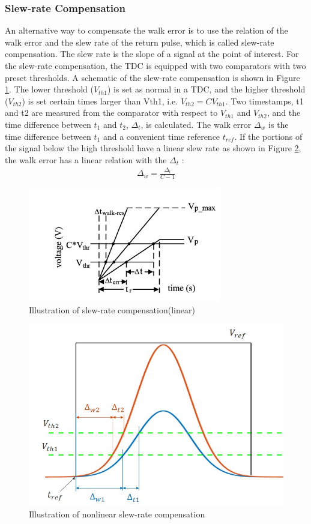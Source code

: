 \subsubsection{Slew-rate Compensation}
An alternative way to compensate the walk error is to use the relation of the walk error and the slew rate of the return pulse, which is called slew-rate compensation. The slew rate is the slope of a signal at the point of interest. For the slew-rate compensation, the TDC is equipped with two comparators with two preset thresholds. A schematic of the slew-rate compensation is shown in Figure \ref{fig:TDC_slewrateLinear}. The lower threshold ($V_{th1}$) is set as normal in a TDC, and the higher threshold ($V_{th2}$) is set certain times larger than Vth1, i.e. $V_{th2} = CV_{th1}$. Two timestamps, t1 and t2 are measured from the comparator with respect to $V_{th1}$ and $V_{th2}$, and the time difference between $t_1$ and $t_2$, $\Delta_t$, is calculated. The walk error $\Delta_w$ is the time difference between $t_1$ and a convenient time reference $t_{ref}$. If the portions of the signal below the high threshold have a linear slew rate as shown in Figure \ref{fig:TDC_slewrate}, the walk error has a linear relation with the $\Delta_t$ \citep{nissinen2009integrated}:
\begin{align}
    \Delta_w=\frac{\Delta_t}{C-1}
\end{align}
\begin{figure}[t!p]
\centering
\includegraphics[width=.8\textwidth]{figures/chapter3_TDC/slew-rate.jpg}
\caption{Illustration of slew-rate compensation(linear)}
\label{fig:TDC_slewrateLinear}
\end{figure}
\begin{figure}[t!p]
\centering
\includegraphics[width=.8\textwidth]{figures/chapter3_TDC/slew-rate0.jpg}
\caption{Illustration of nonlinear slew-rate compensation}
\label{fig:TDC_slewrate}
\end{figure}
